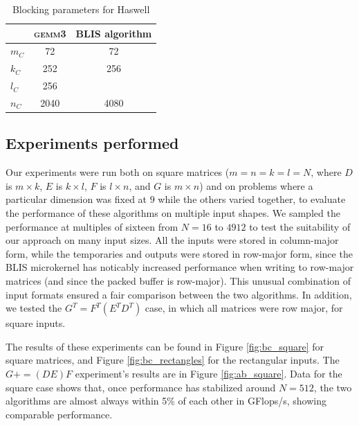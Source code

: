 \documentclass[12pt]{article}
\newcommand*{\pluseq}{\mathrel{{+}{=}}}
\newcommand*{\gemmt}{{\textsc{gemm3}}}
\begin{document}
\begin{table}
  \centering
  \begin{tabular}{l|c c}
    &\gemmt{}&BLIS algorithm\\ \hline
    $m_C$&72&72\\
    $k_C$&252&256\\
    $l_C$&256&\\
    $n_C$&2040&4080\\
  \end{tabular}
  \caption{Blocking parameters for Haswell}
  \label{tab:parameters}
\end{table}

\subsection{Experiments performed}
Our experiments were run both on square matrices ($m = n = k = l = N$, where $D$ is $m \times k$, $E$ is $k \times l$, $F$ is $l \times n$, and $G$ is $m \times n$) and on problems where a particular dimension was fixed at $9$ while the others varied together, to evaluate the performance of these algorithms on multiple input shapes.
We sampled the performance at multiples of sixteen from $N = 16$ to $4912$ to test the suitability of our approach on many input sizes.
All the inputs were stored in column-major form, while the temporaries and outputs were stored in row-major form, since the BLIS microkernel has noticably increased performance when writing to row-major matrices (and since the packed buffer is row-major).
This unusual combination of input formats ensured a fair comparison between the two algorithms.
In addition, we tested the $G^T = F^T(E^TD^T)$ case, in which all matrices were row major, for square inputs.

The results of these experiments can be found in Figure \ref{fig:bc_square} for square matrices, and Figure \ref{fig:bc_rectangles} for the rectangular inputs.
The $G \pluseq (DE)F$ experiment's results are in Figure \ref{fig:ab_square}.
Data for the square case shows that, once performance has stabilized around $N = 512$, the two algorithms are almost always within 5\% of each other in GFlops/s, showing comparable performance.
\end{document}
